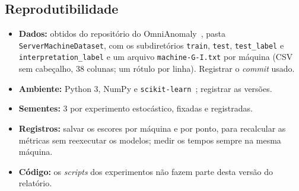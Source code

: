 \subsection{Reprodutibilidade}\label{sec:repro}
\begin{itemize}
  \item \textbf{Dados:} obtidos do repositório do OmniAnomaly~\cite{omnianomaly}, pasta
        \texttt{ServerMachineDataset}, com os subdiretórios \texttt{train}, \texttt{test},
        \texttt{test\_label} e \texttt{interpretation\_label} e um arquivo \texttt{machine-G-I.txt} por
        máquina (CSV sem cabeçalho, 38 colunas; um rótulo por linha). Registrar o \emph{commit} usado.
  \item \textbf{Ambiente:} Python 3, NumPy e \texttt{scikit-learn}~\cite{pedregosa2011}; registrar as versões.
  \item \textbf{Sementes:} 3 por experimento estocástico, fixadas e registradas.
  \item \textbf{Registros:} salvar os escores por máquina e por ponto, para recalcular as métricas sem reexecutar
        os modelos; medir os tempos sempre na mesma máquina.
  \item \textbf{Código:} os \emph{scripts} dos experimentos não fazem parte desta versão do relatório.
\end{itemize}
